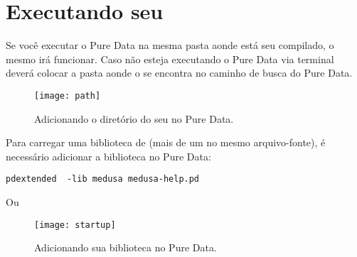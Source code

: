 \section{Executando seu \external}

Se você executar o Pure Data na mesma pasta aonde está seu \external compilado,
o mesmo irá funcionar. Caso não esteja executando o Pure Data via terminal
deverá colocar a pasta aonde o \external se encontra no caminho de busca do
Pure Data.

\begin{figure}[h!]
	\centering
	\texttt{[image: path]}
	\caption{Adicionando o diretório do seu \external no Pure Data.}
\end{figure}

Para carregar uma biblioteca de \externals (mais de um \external no mesmo
arquivo-fonte), é necessário adicionar a biblioteca no Pure Data:

\begin{lstlisting}
pdextended  -lib medusa medusa-help.pd 
\end{lstlisting}

Ou 

\begin{figure}[h!]
	\centering
	\texttt{[image: startup]}
	\caption{Adicionando sua biblioteca no Pure Data.}
\end{figure}


